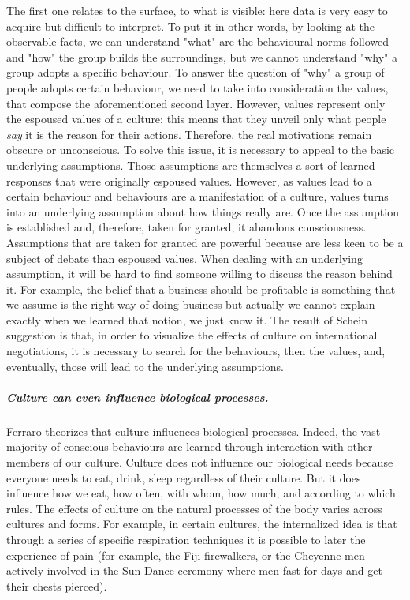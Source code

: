 \documentclass[../main.tex]{subfiles}
\begin{document}
The first one relates to the surface, to what is visible: here data is very easy to acquire but difficult to interpret. To put it in other words, by looking at the observable facts, we can understand "what" are the behavioural norms followed and "how" the group builds the surroundings, but we cannot understand "why" a group adopts a specific behaviour. To answer the question of "why" a group of people adopts certain behaviour, we need to take into consideration the values, that compose the aforementioned second layer. However, values represent only the espoused values of a culture: this means that they unveil only what people \textit{say} it is the reason for their actions. Therefore, the real motivations remain obscure or unconscious. To solve this issue, it is necessary to appeal to the basic underlying assumptions. Those assumptions are themselves a sort of learned responses that were originally espoused values. However, as values lead to a certain behaviour and behaviours are a manifestation of a culture, values turns into an underlying assumption about how things really are. Once the assumption is established and, therefore, taken for granted, it abandons consciousness. Assumptions that are taken for granted are powerful because are less keen to be a subject of debate than espoused values. When dealing with an underlying assumption, it will be hard to find someone willing to discuss the reason behind it. For example, the belief that a business should be profitable is something that we assume is the right way of doing business but actually we cannot explain exactly when we learned that notion, we just know it. The result of Schein suggestion is that, in order to visualize the effects of culture on international negotiations, it is necessary to search for the behaviours, then the values, and, eventually, those will lead to the underlying assumptions.%

\subparagraph*{Culture can even influence biological processes.} Ferraro\cite{ferraro} theorizes that culture influences biological processes. Indeed, the vast majority of conscious behaviours are learned through interaction with other members of our culture. Culture does not influence our biological needs because everyone needs to eat, drink, sleep regardless of their culture. But it does influence how we eat, how often, with whom, how much, and according to which rules. The effects of culture on the natural processes of the body varies across cultures and forms. For example, in certain cultures, the internalized idea is that through a series of specific respiration techniques it is possible to later the experience of pain (for example, the Fiji firewalkers, or the Cheyenne men actively involved in the Sun Dance ceremony where men fast for days and get their chests pierced).
\end{document}

